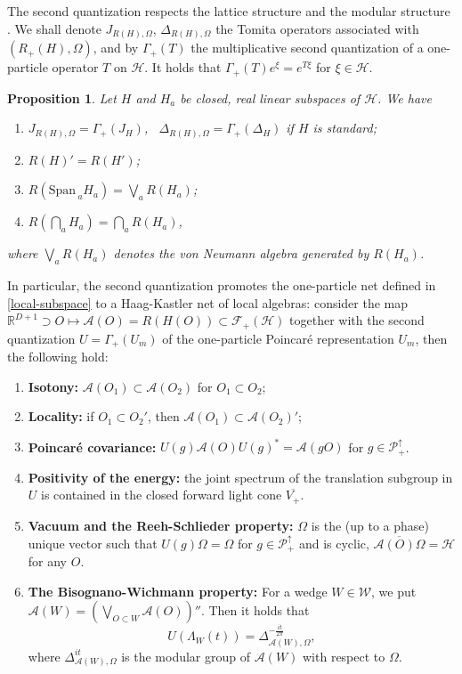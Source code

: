 \documentclass[12pt]{article}
\newcounter{axiomhk}
\def\RR{{\mathbb R}}
\def\A{{\mathcal A}}
\def\H{{\mathcal H}}
\def\P{{\mathcal P}}
\def\Span{{\mathrm{Span}\,}}
\def\poincare{{\P^\uparrow_+}}
\newtheorem{proposition}[theorem]{Proposition}
\theoremstyle{remark}
\begin{document}
The second quantization respects the lattice structure \cite{Araki63} and the modular structure \cite{LRT78,LMR16}. We shall denote $J_{R(H),\Omega}$, $\Delta_{R(H),\Omega}$ the Tomita operators associated with $(R_+(H),\Omega)$, and by
$\Gamma_+(T)$ the multiplicative second quantization of a one-particle
operator $T$ on $\H$. It holds that $\Gamma_+(T)e^\xi=e^{T\xi}$ for $\xi \in \H$.

\begin{proposition}\label{prop:secquant}\cite{LRT78,LMR16}
Let $H$ and $H_a$ be closed, real linear subspaces of $\H$. We have
\begin{enumerate}
\item $J_{R(H),\Omega} = {\Gamma}_+(J_H)$, \ $\Delta_{R(H),\Omega}= {\Gamma}_+(\Delta_H)$ if $H$ is standard;
\item $R(H)' = R(H')$;
\item $R(\Span_a H_a) = \bigvee_a R(H_a)$;
\item $R(\bigcap_a H_a) = \bigcap_a R(H_a)$,
\end{enumerate}
where $\bigvee_a R(H_a)$ denotes the von Neumann algebra generated by $R(H_a)$.
\end{proposition}

In particular, the second quantization promotes the one-particle net defined in \eqref{local-subspace}
to a Haag-Kastler net of local algebras: consider the map $\RR^{D+1}\supset O\mapsto \A(O)=R(H(O))\subset \mathcal{F}_+(\H)$
together with the second quantization $U=\Gamma_+(U_m)$ of the one-particle Poincar\'e representation $U_m$, then the following hold:
\begin{enumerate}[{(HK}1{)}]
 \item \textbf{Isotony: } $\A(O_1) \subset \A(O_2)$ for $O_1 \subset O_2$; \label{isotony}
 \item \textbf{Locality:}  if $O_1\subset O_2'$, then $\A(O_1)\subset \A(O_2)'$; \label{locality}
 \item\textbf{Poincar\'e covariance:} \label{poincare}
  $U(g)\A(O)U(g)^*=\A(gO)$ for $g\in\P_+^\uparrow$.
 \item\textbf{Positivity of the energy:}
 the joint spectrum of the translation subgroup in $U$ is contained in the closed forward light cone
 $\overline {V_+}$. \label{positiveenergy}
 
 \item \textbf{Vacuum and the Reeh-Schlieder property: } $\Omega$ is the (up to a phase) unique vector
 such that $U(g)\Omega=\Omega$ for $g\in \poincare$ and is cyclic, $\overline{\A(O)\Omega}=\H$ for any $O$. \label{vacuum}
 
 \item\textbf{The Bisognano-Wichmann property:} \label{bw} For a wedge $W \in \mathcal{W}$, 
 we put $\A(W)= \left(\bigvee_{O\subset W} \A(O)\right)''$.
 Then it holds that
 \[
  U(\Lambda_{W}(t))=\Delta_{\A(W),\Omega}^{-\frac{it}{2\pi}},
 \]
 where $\Delta_{\A(W),\Omega}^{it}$ is the modular group of $\A(W)$ with respect to $\Omega$.
 \setcounter{axiomhk}{\value{enumi}}
 \end{enumerate}
\end{document}
